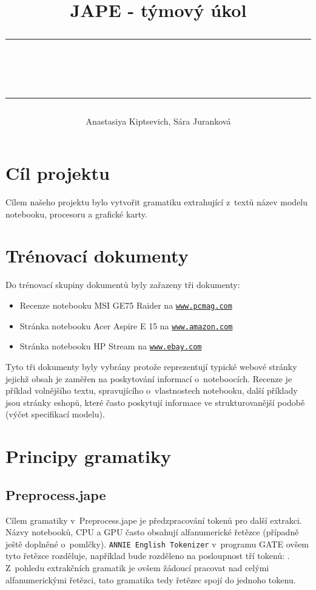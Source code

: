 \documentclass[a4,12pt]{article}
\title{
JAPE - týmový úkol\\
\begin{spacing}{0.1}
\noindent
\rule{\linewidth}{0.3pt}\\\rule{\linewidth}{0.9pt}
\end{spacing}
\rule[75pt]{0pt}{0pt}
}
\author{Anastasiya Kiptsevich, Sára Juranková }
\let\Oldsection\section
\renewcommand{\section}{\FloatBarrier\Oldsection}
\let\Oldsubsection\subsection
\renewcommand{\subsection}{\FloatBarrier\Oldsubsection}
\begin{document}
\maketitle
\tableofcontents

\newpage
\section{Cíl projektu}
Cílem našeho projektu bylo vytvořit gramatiku extrahující z~textů název modelu notebooku, procesoru a  grafické karty.
\section{Trénovací dokumenty}
Do trénovací skupiny dokumentů byly zařazeny tři dokumenty:
\begin{itemize}
\item Recenze notebooku MSI GE75 Raider na \href{https://www.pcmag.com/review/367363/msi-ge75-raider}{\texttt{www.pcmag.com}}
\item Stránka notebooku Acer Aspire E 15 na \href{https://www.amazon.com/Acer-Aspire-i3-8130U-Memory-E5-576-392H/dp/B079TGL2BZ/}{\texttt{www.amazon.com}}
\item Stránka notebooku HP Stream na \href{https://www.ebay.com/itm/NEW-HP-Stream-14-Laptop-Celeron-N3060-4GB-RAM-32GB-SSD-Windows-10/323484448208?var=512535004668&fbclid=IwAR1-YBPLIUAlaY6gOSYBQOsmyb3mCOY8J6BuRLOxIC3l2n_n4U44I_ixgeI}{\texttt{www.ebay.com}}
\end{itemize}
Tyto tři dokumenty byly vybrány protože reprezentují typické webové stránky jejichž obsah je zaměřen na poskytování informací o~noteboocích. Recenze je příklad volnějšího textu, spravujícího o~vlastnostech notebooku, další příklady jsou stránky eshopů, které často poskytují informace ve strukturovanější podobě (výčet specifikací modelu). 

\section{Principy gramatiky}
\subsection{Preprocess.jape}
Cílem gramatiky v~Preprocess.jape je předzpracování tokenů pro další extrakci. Názvy notebooků, CPU a GPU často obsahují alfanumerické řetězce (případně ještě doplněné o~pomlčky). \texttt{ANNIE English Tokenizer} v~programu GATE ovšem tyto řetězce rozděluje, například  bude rozděleno na posloupnost tří tokenů:   . Z~pohledu extrakčních gramatik je ovšem žádoucí pracovat nad celými alfanumerickými řetězci, tato gramatika tedy řetězec  spojí do jednoho tokenu.
\end{document}
